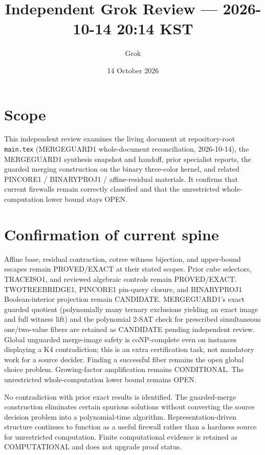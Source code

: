 \documentclass[11pt]{article}
\title{Independent Grok Review --- 2026-10-14 20:14 KST}
\author{Grok}
\date{14 October 2026}
\begin{document}
\maketitle

\begin{center}
\end{center}

\section{Scope}
This independent review examines the living document at repository-root \texttt{main.tex} (MERGEGUARD1 whole-document reconciliation, 2026-10-14), the MERGEGUARD1 synthesis snapshot and handoff, prior specialist reports, the guarded merging construction on the binary three-color kernel, and related PINCORE1 / BINARYPROJ1 / affine-residual materials. It confirms that current firewalls remain correctly classified and that the unrestricted whole-computation lower bound stays OPEN.

\section{Confirmation of current spine}
Affine base, residual contraction, cotree witness bijection, and upper-bound escapes remain PROVED/EXACT at their stated scopes. Prior cube selectors, TRACEISO1, and reviewed algebraic controls remain PROVED/EXACT. TWOTREEBRIDGE1, PINCORE1 pin-query closure, and BINARYPROJ1 Boolean-interior projection remain CANDIDATE. MERGEGUARD1's exact guarded quotient (polynomially many ternary exclusions yielding an exact image and full witness lift) and the polynomial 2-SAT check for prescribed simultaneous one/two-value fibers are retained as CANDIDATE pending independent review. Global unguarded merge-image safety is coNP-complete even on instances displaying a K4 contradiction; this is an extra certification task, not mandatory work for a source decider. Finding a successful fiber remains the open global choice problem. Growing-factor amplification remains CONDITIONAL. The unrestricted whole-computation lower bound remains OPEN.

No contradiction with prior exact results is identified. The guarded-merge construction eliminates certain spurious solutions without converting the source decision problem into a polynomial-time algorithm. Representation-driven structure continues to function as a useful firewall rather than a hardness source for unrestricted computation. Finite computational evidence is retained as COMPUTATIONAL and does not upgrade proof status.
\end{document}
